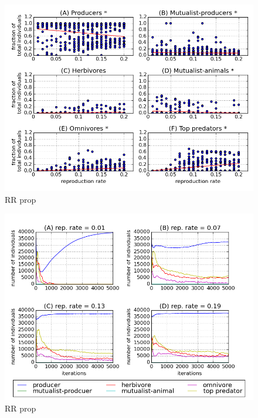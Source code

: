 \begin{figure}
	\centering
	\includegraphics[width=1.0\linewidth]{"figures/rr_proportion_per_functional_group_mai05"}
	\caption{RR prop}
	\label{fig:rr_prop_per_fg_mai05}
\end{figure}



\begin{figure}
	\centering
	\includegraphics[width=1.0\linewidth]{"figures/rr_mean_trophic_dynamics_mai00"}
	\caption{RR prop}
	\label{fig:rr_mean_troph_dynamics_mai0}
\end{figure}

